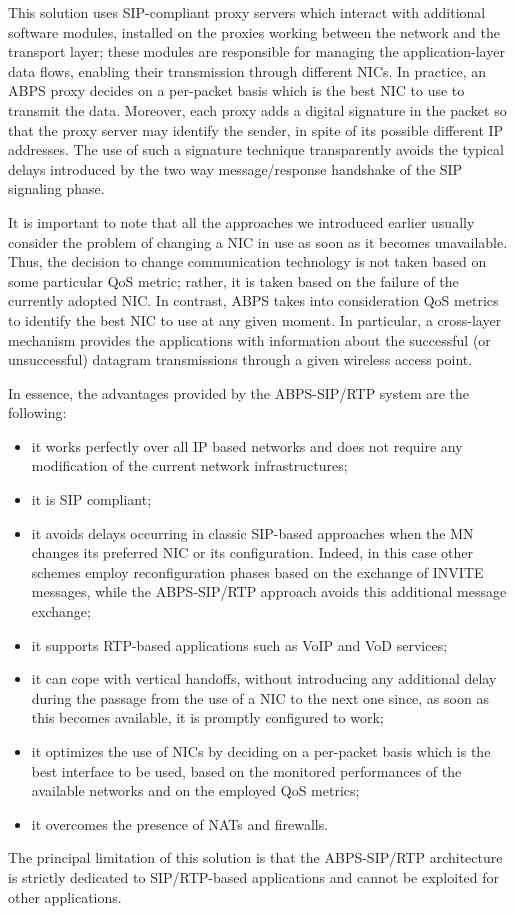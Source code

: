\documentclass[preprint,12pt]{elsarticle}
\begin{document}
This solution uses SIP-compliant proxy servers which interact with additional software modules, installed on the proxies working between the network and the transport layer; these modules are responsible for managing the application-layer data flows, enabling their transmission through different NICs. 
In practice, an ABPS proxy decides on a per-packet basis which is the best NIC to use to transmit the data. Moreover, each proxy adds a digital signature in the packet so that the proxy server may identify the sender, in spite of its possible different IP addresses. 
The use of such a signature technique transparently avoids the typical delays introduced by the two way message/response handshake of the SIP signaling phase.

It is important to note that all the approaches we introduced earlier usually consider the problem of changing a NIC in use as soon as it becomes unavailable. 
Thus, the decision to change communication technology is not taken based on some particular QoS metric; rather, it is taken based on the failure of the currently adopted NIC. 
In contrast, ABPS takes into consideration QoS metrics to identify the best NIC to use at any given moment. 
In particular, a cross-layer mechanism 
provides the applications with information about the successful (or unsuccessful) datagram transmissions through a given wireless access point. 

In essence, the advantages provided by the ABPS-SIP/RTP system are the following:
\begin{itemize}
 \item it works perfectly over all IP based networks and does not require any modification of the current network infrastructures;
 \item it is SIP compliant;
 \item it avoids delays occurring in classic SIP-based approaches when the MN changes its preferred NIC or its configuration. Indeed, in this case other schemes employ reconfiguration phases based on the exchange of INVITE messages, while the ABPS-SIP/RTP approach avoids this additional message exchange;
 \item it supports RTP-based applications such as VoIP and VoD services;
 \item it can cope with vertical handoffs, without introducing any additional delay during the passage from the use of a NIC to the next one since, as soon as this becomes available, it is promptly configured to work;
 \item it optimizes the use of NICs by deciding on a per-packet basis which is the best interface to be used, based on the monitored performances of the available networks and on the employed QoS metrics;
 \item it overcomes the presence of NATs and firewalls.
\end{itemize}
The principal limitation of this solution is that the ABPS-SIP/RTP architecture is strictly dedicated to SIP/RTP-based applications and cannot be exploited for other applications. 
\end{document}

